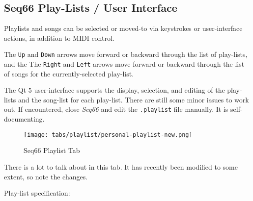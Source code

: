 \subsection{Seq66 Play-Lists / User Interface}
\label{subsec:playlist_uis}

   Playlists and songs can be selected or moved-to via keystrokes or
   user-interface actions, in addition to MIDI control.

   The \texttt{Up} and \texttt{Down} arrows move forward or backward through
   the list of play-lists, and the
   The \texttt{Right} and \texttt{Left} arrows move forward or backward through
   the list of songs for the currently-selected play-list.

   The Qt 5 user-interface supports the display, selection, and editing of
   the play-lists and the song-list for each play-list.
   There are still some minor issues to work out.  If encountered, close
   \textsl{Seq66} and edit the \texttt{.playlist} file manually.
   It is self-documenting.

\begin{figure}[H]
   \centering 
   \texttt{[image: tabs/playlist/personal-playlist-new.png]}
   \caption*{Seq66 Playlist Tab}
\end{figure}

   There is a lot to talk about in this tab.
   It has recently been modified to some extent, so note the changes.

   Play-list specification:

